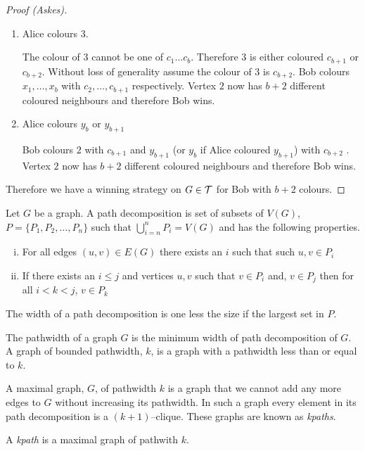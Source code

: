 \begin{proof}[Proof (Askes)]
\begin{enumerate}
        \item Alice colours $3$.
               
        The colour of $3$ cannot be one of $c_1 \ldots c_{b}$. Therefore $3$ is either coloured $c_{b+1}$ or $c_{b+2}$. 
        Without loss of generality assume the colour of $3$ is $c_{b+2}$.
        Bob colours $x_1, \dots ,x_{b}$ with $c_2,\dots,c_{b+1}$ respectively.
        Vertex $2$ now has $b+2$ different coloured neighbours and therefore Bob wins.  
                       
        \item Alice colours $y_{b}$ or $y_{b+1}$
        
        Bob colours $2$ with $c_{b+1}$ and $y_{b+1}$ (or $y_{b}$ if Alice coloured $y_{b+1}$) with $c_{b+2}$ .
        Vertex $2$ now has $b+2$ different coloured neighbours and therefore Bob wins. 
    \end{enumerate}

    Therefore we have a winning strategy on $G \in\mathcal{T}$ for Bob with $b+2$ colours. 
\end{proof}

\begin{definition}
    Let $G$ be a graph. A path decomposition is set of subsets of $V(G)$, $P=\{P_1,P_2,\dots,P_n\}$ such that $\bigcup_{i=n}^n P_i=V(G)$ and has the following properties.    
    \begin{enumerate}[(i)]
        \item For all edges $(u,v) \in E(G)$ there exists an $i$ such that such $u,v\in P_i$
        \item If there exists an $i\leq j$ and vertices $u,v$ such that $v\in P_i$ and, $v\in P_j$ then for all $i<k<j$, $v\in P_k$
    \end{enumerate}
    The width of a path decomposition is one less the size if the largest set in $P$.
\end{definition}

\begin{definition}[Pathwidth]
    The pathwidth of a graph $G$ is the minimum width of path decomposition of $G$.    
    A graph of bounded pathwidth, $k$, is a graph with a pathwidth less than or equal to $k$. 
\end{definition}

A maximal graph, $G$, of pathwidth $k$ is a graph that we cannot add any more edges to $G$ without increasing its pathwidth. In such a graph every element in its path decomposition is a $(k+1)$--clique. These graphs are known as \textit{kpaths}.
\begin{definition}[kpath]
    A \textit{kpath} is a maximal graph of pathwith $k$.
\end{definition}

